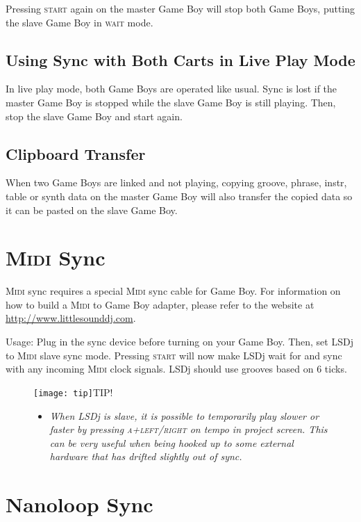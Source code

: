 Pressing \textsc{start} again on the master Game Boy will stop both Game Boys, putting the slave Game Boy in \textsc{wait} mode.

\subsection{Using Sync with Both Carts in Live Play Mode}

In live play mode, both Game Boys are operated like usual. Sync is lost if the master Game Boy is stopped while the slave Game Boy is still playing. Then, stop the slave Game Boy and start again.

\subsection{Clipboard Transfer}

When two Game Boys are linked and not playing, copying groove, phrase, instr, table or synth data on the master Game Boy will also transfer the copied data so it can be pasted on the slave Game Boy.

\section{\textsc{Midi} Sync}

\textsc{Midi} sync requires a special \textsc{Midi} sync cable for Game Boy. For information on how to build a \textsc{Midi} to Game Boy adapter, please refer to the website at \url{http://www.littlesounddj.com}.

Usage: Plug in the sync device before turning on your Game Boy. Then, set LSDj to \textsc{Midi} slave sync mode. Pressing \textsc{start} will now make LSDj wait for and sync with any incoming \textsc{Midi} clock signals. LSDj should use grooves based on 6 ticks.

\begin{figure}[hbtp]
\texttt{[image: tip]}TIP!
\begin{itemize}
        \item \textit{When LSDj is slave, it is possible to temporarily play
slower or faster by pressing \textsc{a+left/right} on tempo in project screen. This can
be very useful when being hooked up to some external hardware that has drifted slightly out
of sync.}
	\end{itemize}
\end{figure}

\section{Nanoloop Sync}

